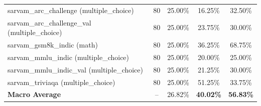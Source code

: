 \begin{table}[ht]
\begin{tabular}{lcccc}
sarvam\_arc\_challenge (multiple\_choice) & 80 & 25.00\% & 16.25\% & 32.50\% \\
sarvam\_arc\_challenge\_val (multiple\_choice) & 80 & 25.00\% & 23.75\% & 30.00\% \\
sarvam\_gsm8k\_indic (math) & 80 & 25.00\% & 36.25\% & 68.75\% \\
sarvam\_mmlu\_indic (multiple\_choice) & 80 & 25.00\% & 20.00\% & 25.00\% \\
sarvam\_mmlu\_indic\_val (multiple\_choice) & 80 & 25.00\% & 21.25\% & 30.00\% \\
sarvam\_triviaqa (multiple\_choice) & 80 & 25.00\% & 51.25\% & 33.75\% \\
\hline
\textbf{Macro Average} & -- & 26.82\% & \textbf{40.02\%} & \textbf{56.83\%} \\
\hline
\end{tabular}
\end{table}